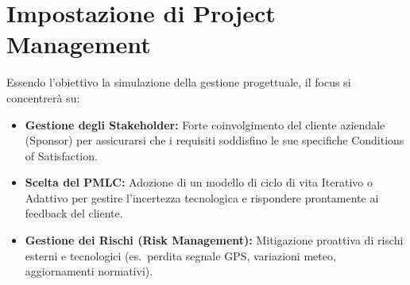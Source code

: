 \documentclass[12pt, a4paper]{article}
\begin{document}
\section*{Impostazione di Project Management}
Essendo l'obiettivo la simulazione della gestione progettuale, il focus si concentrerà su:
\begin{itemize}[label=\textbullet]
    \item \textbf{Gestione degli Stakeholder:} Forte coinvolgimento del cliente aziendale (Sponsor) per assicurarsi che i requisiti soddisfino le sue specifiche Conditions of Satisfaction.
    \item \textbf{Scelta del PMLC:} Adozione di un modello di ciclo di vita Iterativo o Adattivo per gestire l'incertezza tecnologica e rispondere prontamente ai feedback del cliente.
    \item \textbf{Gestione dei Rischi (Risk Management):} Mitigazione proattiva di rischi esterni e tecnologici (es.\ perdita segnale GPS, variazioni meteo, aggiornamenti normativi).
\end{itemize}
\end{document}
